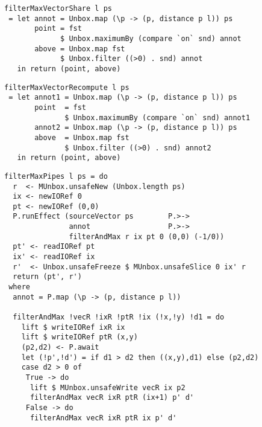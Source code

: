 \begin{lstlisting}[float,label=l:a:bench:filterMaxVectorShare,caption=Vector / share implementation of \Hs/filterMax/]
filterMaxVectorShare l ps
 = let annot = Unbox.map (\p -> (p, distance p l)) ps
       point = fst
             $ Unbox.maximumBy (compare `on` snd) annot
       above = Unbox.map fst
             $ Unbox.filter ((>0) . snd) annot
   in return (point, above)
\end{lstlisting}

\begin{lstlisting}[float,label=l:a:bench:filterMaxVectorRecompute,caption=Vector / recompute implementation of \Hs/filterMax/]
filterMaxVectorRecompute l ps
 = let annot1 = Unbox.map (\p -> (p, distance p l)) ps
       point  = fst
              $ Unbox.maximumBy (compare `on` snd) annot1
       annot2 = Unbox.map (\p -> (p, distance p l)) ps
       above  = Unbox.map fst
              $ Unbox.filter ((>0) . snd) annot2
   in return (point, above)
\end{lstlisting}

\begin{lstlisting}[float,label=l:a:bench:filterMaxPipes,caption=Pipes implementation of \Hs/filterMax/]
filterMaxPipes l ps = do
  r  <- MUnbox.unsafeNew (Unbox.length ps)
  ix <- newIORef 0
  pt <- newIORef (0,0)
  P.runEffect (sourceVector ps        P.>->
               annot                  P.>->
               filterAndMax r ix pt 0 (0,0) (-1/0))
  pt' <- readIORef pt
  ix' <- readIORef ix
  r'  <- Unbox.unsafeFreeze $ MUnbox.unsafeSlice 0 ix' r
  return (pt', r')
 where
  annot = P.map (\p -> (p, distance p l))

  filterAndMax !vecR !ixR !ptR !ix (!x,!y) !d1 = do
    lift $ writeIORef ixR ix
    lift $ writeIORef ptR (x,y)
    (p2,d2) <- P.await
    let (!p',!d') = if d1 > d2 then ((x,y),d1) else (p2,d2)
    case d2 > 0 of
     True -> do
      lift $ MUnbox.unsafeWrite vecR ix p2
      filterAndMax vecR ixR ptR (ix+1) p' d'
     False -> do
      filterAndMax vecR ixR ptR ix p' d'
\end{lstlisting}

% 


